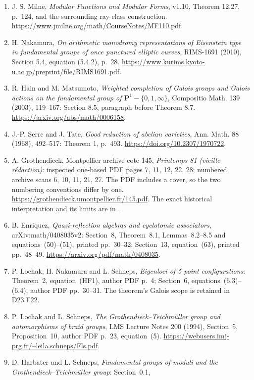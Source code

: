 \documentclass[11pt]{article}
\begin{document}
\begin{enumerate}
\url{https://www.jmilne.org/math/CourseNotes/LEC.pdf}.
\item J. S. Milne, \emph{Modular Functions and Modular Forms},
v1.10, Theorem 12.27, p.~124, and the surrounding ray-class
construction. \url{https://www.jmilne.org/math/CourseNotes/MF110.pdf}.
\item H. Nakamura, \emph{On arithmetic monodromy representations
of Eisenstein type in fundamental groups of once punctured
elliptic curves}, RIMS-1691 (2010), Section 5.4, equation
(5.4.2), p.~28.
\url{https://www.kurims.kyoto-u.ac.jp/preprint/file/RIMS1691.pdf}.
\item R. Hain and M. Matsumoto, \emph{Weighted completion of
Galois groups and Galois actions on the fundamental group of
$\mathbf P^1-\{0,1,\infty\}$}, Compositio Math. 139 (2003),
119--167: Section 8.5, paragraph before Theorem 8.7.
\url{https://arxiv.org/abs/math/0006158}.
\item J.-P. Serre and J. Tate, \emph{Good reduction of abelian
varieties}, Ann. Math. 88 (1968), 492--517: Theorem 1, p.~493.
\url{https://doi.org/10.2307/1970722}.
\item A. Grothendieck, Montpellier archive cote 145,
\emph{Printemps 81 (vieille r\'edaction)}: inspected one-based
PDF pages 7, 11, 12, 22, 28; numbered archive scans
6, 10, 11, 21, 27.  The PDF includes a cover, so the two
numbering conventions differ by one.
\url{https://grothendieck.umontpellier.fr/145.pdf}.
The exact historical interpretation and its limits are in
.
\item B. Enriquez, \emph{Quasi-reflection algebras and cyclotomic
associators}, arXiv:math/0408035v2: Section~8, Theorem~8.1,
Lemmas~8.2--8.5 and equations~(50)--(51), printed pp.~30--32;
Section~13, equation~(63), printed pp.~48--49.
\url{https://arxiv.org/pdf/math/0408035}.
\item P. Lochak, H. Nakamura and L. Schneps,
\emph{Eigenloci of 5 point configurations}: Theorem~2,
equation~(HF1), author PDF p.~4; Section~6,
equations~(6.3)--(6.4), author PDF pp.~30--31.
The theorem's Galois scope is retained in D23.F22.
\item P. Lochak and L. Schneps, \emph{The Grothendieck--Teichm\"uller
group and automorphisms of braid groups}, LMS Lecture Notes 200
(1994), Section~5, Proposition~10, author PDF p.~23, equation~(5).
\url{https://webusers.imj-prg.fr/~leila.schneps/Fls.pdf}.
\item D. Harbater and L. Schneps, \emph{Fundamental groups of
moduli and the Grothendieck--Teichm\"uller group}: Section~0.1,

\end{enumerate}
\end{document}
